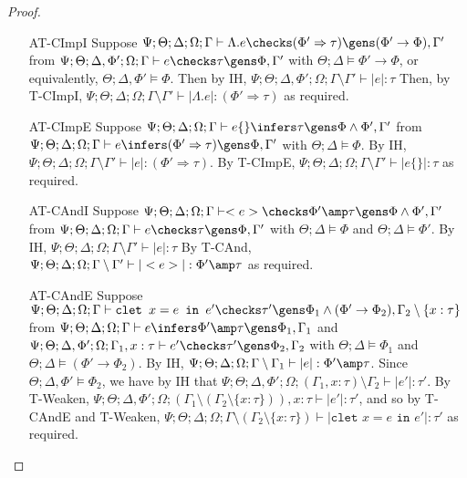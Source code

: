 \begin{proof}
\begin{enumerate}
  \item[AT-CImpI] Suppose $\Psi ; \Theta ; \Delta ; \Omega ; \Gamma \vdash \Lambda .e \checks (\Phi' \Rightarrow \tau) \gens (\Phi' \to \Phi),\Gamma'$ from $\Psi ; \Theta ; \Delta,\Phi' ; \Omega ; \Gamma \vdash e \checks \tau \gens \Phi,\Gamma'$ with $\Theta ; \Delta \vDash \Phi' \to \Phi$, or equivalently, $\Theta ; \Delta, \Phi' \vDash \Phi$. Then by IH, $\Psi ; \Theta ; \Delta,\Phi' ; \Omega ; \Gamma \setminus \Gamma' \vdash |e| : \tau$  Then, by T-CImpI, $\Psi ; \Theta ; \Delta ; \Omega ; \Gamma \setminus \Gamma' \vdash |\Lambda .e| : (\Phi' \Rightarrow \tau)$ as required.
  \item[AT-CImpE] Suppose $\Psi ; \Theta ; \Delta ; \Omega ; \Gamma \vdash e \{\} \infers \tau \gens \Phi \wedge \Phi',\Gamma'$ from $\Psi ; \Theta ; \Delta ; \Omega ; \Gamma \vdash e \infers (\Phi' \Rightarrow \tau) \gens \Phi,\Gamma'$ with $\Theta ; \Delta \vDash \Phi$. By IH, $\Psi ; \Theta ; \Delta ; \Omega ; \Gamma \setminus \Gamma' \vdash |e| : (\Phi' \Rightarrow \tau)$. By T-CImpE, $\Psi ; \Theta ; \Delta ; \Omega ; \Gamma \setminus \Gamma' \vdash |e \{\}| : \tau$ as required.
  \item[AT-CAndI] Suppose $\Psi ; \Theta ; \Delta ; \Omega ; \Gamma \vdash <e> \checks \Phi' \amp \tau \gens \Phi \wedge \Phi',\Gamma'$ from $\Psi ; \Theta ; \Delta ; \Omega ; \Gamma \vdash e \checks \tau \gens \Phi,\Gamma'$ with $\Theta ; \Delta \vDash \Phi$ and $\Theta ; \Delta \vDash \Phi'$. By IH, $\Psi ; \Theta ; \Delta ; \Omega ; \Gamma \setminus \Gamma' \vdash |e| : \tau$ By T-CAnd, $\Psi ; \Theta ; \Delta ; \Omega ; \Gamma \setminus \Gamma' \vdash |<e>| : \Phi' \amp \tau$ as required.
  \item[AT-CAndE] Suppose $\Psi ; \Theta ; \Delta ; \Omega ; \Gamma \vdash \texttt{clet } x = e \texttt{ in } e' \checks \tau' \gens \Phi_1 \wedge (\Phi' \to \Phi_2),\Gamma_2 \setminus \{x : \tau\}$ from $\Psi ; \Theta ; \Delta ; \Omega ; \Gamma \vdash e \infers \Phi' \amp \tau \gens \Phi_1,\Gamma_1$ and $\Psi ; \Theta ; \Delta, \Phi' ; \Omega ; \Gamma_1, x : \tau \vdash e' \checks \tau' \gens \Phi_2, \Gamma_2$ with $\Theta ; \Delta \vDash \Phi_1$ and $\Theta ; \Delta \vDash (\Phi' \to \Phi_2)$. By IH,
   $\Psi ; \Theta ; \Delta ; \Omega ; \Gamma \setminus \Gamma_1 \vdash |e| : \Phi' \amp \tau$. Since $\Theta; \Delta,\Phi' \vDash \Phi_2$, we have by IH that
   $\Psi ; \Theta ; \Delta, \Phi' ; \Omega ; (\Gamma_1, x : \tau) \setminus \Gamma_2 \vdash |e'| : \tau'$. By T-Weaken,
   $\Psi ; \Theta ; \Delta, \Phi' ; \Omega ; (\Gamma_1 \setminus (\Gamma_2 \setminus \{x : \tau\})), x : \tau\vdash |e'| : \tau'$, and so by T-CAndE and T-Weaken, 
   $\Psi ; \Theta ; \Delta ; \Omega ; \Gamma \setminus (\Gamma_2 \setminus \{x : \tau\}) \vdash |\texttt{clet } x = e \texttt{ in } e'| : \tau'$ as required.
  

\end{enumerate}
\end{proof}
